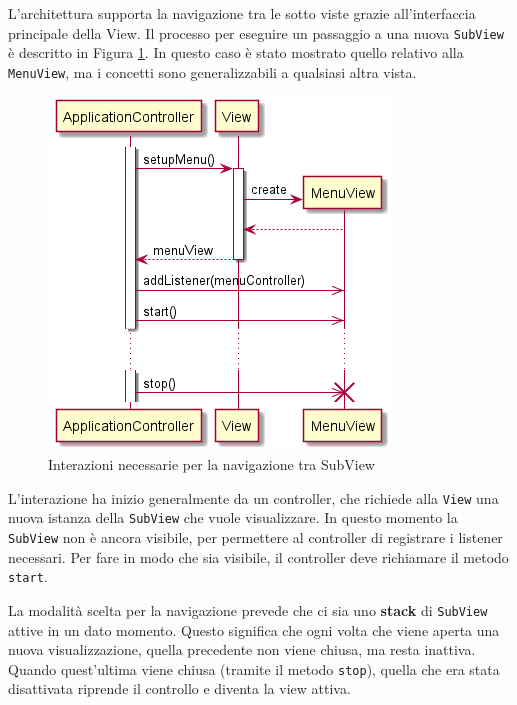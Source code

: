 L'architettura supporta la navigazione tra le sotto viste grazie all'interfaccia principale della View.
%
Il processo per eseguire un passaggio a una nuova \texttt{SubView} è descritto in Figura \ref{fig:view_navigation}.
%
In questo caso è stato mostrato quello relativo alla \texttt{MenuView}, ma i concetti sono generalizzabili a qualsiasi altra vista.
%
\begin{figure}
  \centering
  \includegraphics[width=0.6\linewidth]{images/uml/view_navigation.png}
  \caption{Interazioni necessarie per la navigazione tra SubView}
  \label{fig:view_navigation}
\end{figure}

L'interazione ha inizio generalmente da un controller, che richiede alla \texttt{View} una nuova istanza della \texttt{SubView} che vuole visualizzare.
%
In questo momento la \texttt{SubView} non è ancora visibile, per permettere al controller di registrare i listener necessari.
%
Per fare in modo che sia visibile, il controller deve richiamare il metodo \texttt{start}.

La modalità scelta per la navigazione prevede che ci sia uno \textbf{stack} di \texttt{SubView} attive in un dato momento.
%
Questo significa che ogni volta che viene aperta una nuova visualizzazione, quella precedente non viene chiusa, ma resta inattiva.
%
Quando quest'ultima viene chiusa (tramite il metodo \texttt{stop}), quella che era stata disattivata riprende il controllo e diventa la view attiva.
